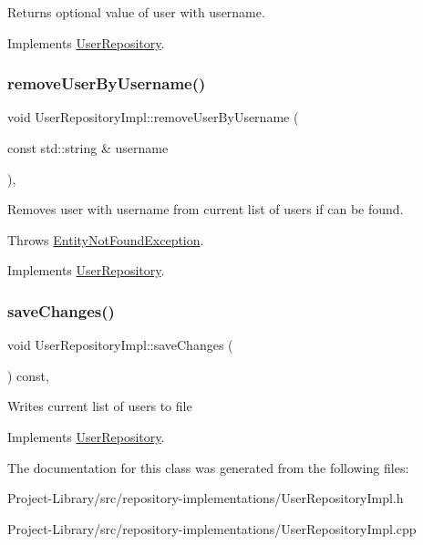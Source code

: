 Returns optional value of user with username. 

Implements \hyperlink{classUserRepository_aeb49a2995f19e516e9d068cb082a9535}{User\+Repository}.

\mbox{\label{classUserRepositoryImpl_a378218667dea52fcd31a345547b9e7cf}} 
\subsubsection{\texorpdfstring{remove\+User\+By\+Username()}{removeUserByUsername()}}
{\footnotesize\ttfamily void User\+Repository\+Impl\+::remove\+User\+By\+Username (\begin{DoxyParamCaption}\item[{const std\+::string \&}]{username }\end{DoxyParamCaption})\hspace{0.3cm}{\ttfamily [override]}, {\ttfamily [virtual]}}

Removes user with username from current list of users if can be found.

Throws \hyperlink{structEntityNotFoundException}{Entity\+Not\+Found\+Exception}. 

Implements \hyperlink{classUserRepository_a32dbae2d045588d858b8f21550987577}{User\+Repository}.

\mbox{\label{classUserRepositoryImpl_a9a4406e613a882f4f71b9325781264a5}} 
\subsubsection{\texorpdfstring{save\+Changes()}{saveChanges()}}
{\footnotesize\ttfamily void User\+Repository\+Impl\+::save\+Changes (\begin{DoxyParamCaption}{ }\end{DoxyParamCaption}) const\hspace{0.3cm}{\ttfamily [override]}, {\ttfamily [virtual]}}

Writes current list of users to file 

Implements \hyperlink{classUserRepository_a282496e98e0cc0d377531575047adeab}{User\+Repository}.



The documentation for this class was generated from the following files\+:\begin{DoxyCompactItemize}
\item 
Project-\/\+Library/src/repository-\/implementations/User\+Repository\+Impl.\+h\item 
Project-\/\+Library/src/repository-\/implementations/User\+Repository\+Impl.\+cpp\end{DoxyCompactItemize}
